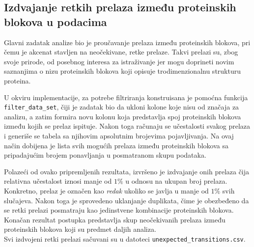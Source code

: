 \documentclass[a4paper,12pt]{article}
\begin{document}
\subsection{Izdvajanje retkih prelaza između proteinskih blokova u podacima}
Glavni zadatak analize bio je proučavanje prelaza između proteinskih blokova, pri čemu je akcenat stavljen na neočekivane, retke prelaze. Takvi prelazi su, zbog svoje prirode, od posebnog interesa za istraživanje jer mogu doprineti novim saznanjima o nizu proteinskih blokova koji opisuje trodimenzionalnu strukturu proteina.  

U okviru implementacije, za potrebe filtriranja konstruisana je pomoćna funkcija \texttt{filter\_data\_set}, čiji je zadatak bio da ukloni kolone koje nisu od značaja za analizu, a zatim formira novu kolonu koja predstavlja spoj proteinskih blokova između kojih se prelaz ispituje. Nakon toga računaju se učestalosti svakog prelaza i generiše se tabela sa njihovim apsolutnim brojevima pojavljivanja. Na ovaj način dobijena je lista svih mogućih prelaza između proteinskih blokova sa pripadajućim brojem ponavljanja u posmatranom skupu podataka.  

Polazeći od ovako pripremljenih rezultata, izvršeno je izdvajanje onih prelaza čija relativna učestalost iznosi manje od $1\%$ u odnosu na ukupan broj prelaza. Konkretno, prelaz je označen kao \emph{redak} ukoliko se javlja u manje od $1\%$ svih slučajeva. Nakon toga je sprovedeno uklanjanje duplikata, čime je obezbeđeno da se retki prelazi posmatraju kao jedinstvene kombinacije proteinskih blokova. Konačan rezultat postupka predstavlja skup neočekivanih prelaza između proteinskih blokova koji su predmet daljih analiza. \\
Svi izdvojeni retki prelazi sačuvani su u datoteci \texttt{unexpected\_transitions.csv}.
\end{document}
